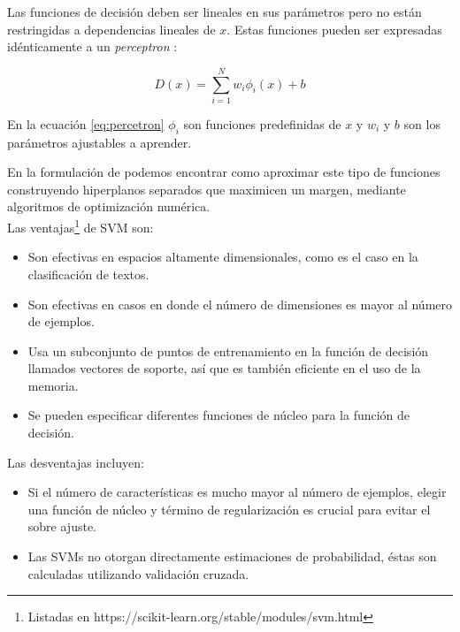 Las funciones de decisión deben ser lineales en sus parámetros pero no están restringidas a dependencias lineales de $x$. Estas funciones pueden ser expresadas idénticamente a un \textit{perceptron }\citep{block1962analysis}:

\begin{equation} \label{eq:percetron}
    D(x) = \sum_{i=1}^{N} w_i\phi_i(x) + b
\end{equation}

En la ecuación \ref{eq:percetron} $ \phi_i$ son funciones predefinidas de $x$ y $w_i$ y $b$ son los parámetros ajustables a aprender.

En la formulación de \citep{boser1992training, cortes1995support} podemos encontrar como aproximar este tipo de funciones construyendo hiperplanos separados que maximicen un margen, mediante algoritmos de optimización numérica. \\

Las ventajas\footnote{Listadas en https://scikit-learn.org/stable/modules/svm.html} de SVM son: 
\begin{itemize}
    \item Son efectivas en espacios altamente dimensionales, como es el caso en la clasificación de textos.
    \item Son efectivas en casos en donde el número de dimensiones es mayor al número de ejemplos.
    \item Usa un subconjunto de puntos de entrenamiento en la función de decisión llamados vectores de soporte, así que es también eficiente en el uso de la memoria.
    \item Se pueden especificar diferentes funciones de núcleo para la función de decisión. 
\end{itemize}

Las desventajas incluyen:
\begin{itemize}
    \item Si el número de características es mucho mayor al número de ejemplos, elegir una función de núcleo y término de regularización es crucial para evitar el sobre ajuste.
    \item Las SVMs no otorgan directamente estimaciones de probabilidad, éstas son calculadas utilizando validación cruzada.
    
\end{itemize}
    
    
    

